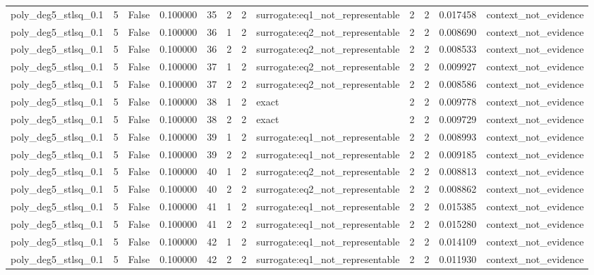 \begin{tabular}{lrrrrrrlrrrl}
poly\_deg5\_stlsq\_0.1 & 5 & False & 0.100000 & 35 & 2 & 2 & surrogate:eq1\_not\_representable & 2 & 2 & 0.017458 & context\_not\_evidence \\
poly\_deg5\_stlsq\_0.1 & 5 & False & 0.100000 & 36 & 1 & 2 & surrogate:eq2\_not\_representable & 2 & 2 & 0.008690 & context\_not\_evidence \\
poly\_deg5\_stlsq\_0.1 & 5 & False & 0.100000 & 36 & 2 & 2 & surrogate:eq2\_not\_representable & 2 & 2 & 0.008533 & context\_not\_evidence \\
poly\_deg5\_stlsq\_0.1 & 5 & False & 0.100000 & 37 & 1 & 2 & surrogate:eq2\_not\_representable & 2 & 2 & 0.009927 & context\_not\_evidence \\
poly\_deg5\_stlsq\_0.1 & 5 & False & 0.100000 & 37 & 2 & 2 & surrogate:eq2\_not\_representable & 2 & 2 & 0.008586 & context\_not\_evidence \\
poly\_deg5\_stlsq\_0.1 & 5 & False & 0.100000 & 38 & 1 & 2 & exact & 2 & 2 & 0.009778 & context\_not\_evidence \\
poly\_deg5\_stlsq\_0.1 & 5 & False & 0.100000 & 38 & 2 & 2 & exact & 2 & 2 & 0.009729 & context\_not\_evidence \\
poly\_deg5\_stlsq\_0.1 & 5 & False & 0.100000 & 39 & 1 & 2 & surrogate:eq1\_not\_representable & 2 & 2 & 0.008993 & context\_not\_evidence \\
poly\_deg5\_stlsq\_0.1 & 5 & False & 0.100000 & 39 & 2 & 2 & surrogate:eq1\_not\_representable & 2 & 2 & 0.009185 & context\_not\_evidence \\
poly\_deg5\_stlsq\_0.1 & 5 & False & 0.100000 & 40 & 1 & 2 & surrogate:eq2\_not\_representable & 2 & 2 & 0.008813 & context\_not\_evidence \\
poly\_deg5\_stlsq\_0.1 & 5 & False & 0.100000 & 40 & 2 & 2 & surrogate:eq2\_not\_representable & 2 & 2 & 0.008862 & context\_not\_evidence \\
poly\_deg5\_stlsq\_0.1 & 5 & False & 0.100000 & 41 & 1 & 2 & surrogate:eq1\_not\_representable & 2 & 2 & 0.015385 & context\_not\_evidence \\
poly\_deg5\_stlsq\_0.1 & 5 & False & 0.100000 & 41 & 2 & 2 & surrogate:eq1\_not\_representable & 2 & 2 & 0.015280 & context\_not\_evidence \\
poly\_deg5\_stlsq\_0.1 & 5 & False & 0.100000 & 42 & 1 & 2 & surrogate:eq1\_not\_representable & 2 & 2 & 0.014109 & context\_not\_evidence \\
poly\_deg5\_stlsq\_0.1 & 5 & False & 0.100000 & 42 & 2 & 2 & surrogate:eq1\_not\_representable & 2 & 2 & 0.011930 & context\_not\_evidence \\

\end{tabular}

